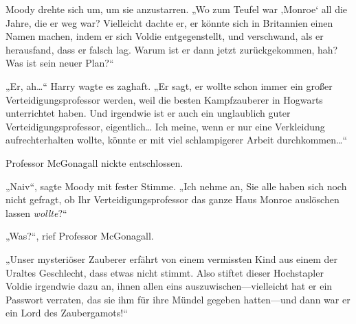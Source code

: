 Moody drehte sich um, um sie anzustarren. „Wo zum Teufel war ‚Monroe‘ all die Jahre, die er weg war? Vielleicht dachte er, er könnte sich in Britannien einen Namen machen, indem er sich Voldie entgegenstellt, und verschwand, als er herausfand, dass er falsch lag. Warum ist er dann jetzt zurückgekommen, hah? Was ist sein neuer Plan?“

„Er, ah…“ Harry wagte es zaghaft. „Er sagt, er wollte schon immer ein großer Verteidigungsprofessor werden, weil die besten Kampfzauberer in Hogwarts unterrichtet haben. Und irgendwie ist er auch ein unglaublich guter Verteidigungsprofessor, eigentlich… Ich meine, wenn er nur eine Verkleidung aufrechterhalten wollte, könnte er mit viel schlampigerer Arbeit durchkommen…“

Professor McGonagall nickte entschlossen.

„Naiv“, sagte Moody mit fester Stimme. „Ich nehme an, Sie alle haben sich noch nicht gefragt, ob Ihr Verteidigungsprofessor das ganze Haus Monroe auslöschen lassen \emph{wollte}?“

„Was?“, rief Professor McGonagall.

„Unser mysteriöser Zauberer erfährt von einem vermissten Kind aus einem der Uraltes Geschlecht, dass etwas nicht stimmt. Also stiftet dieser Hochstapler Voldie irgendwie dazu an, ihnen allen eins auszuwischen—vielleicht hat er ein Passwort verraten, das sie ihm für ihre Mündel gegeben hatten—und dann war er ein Lord des Zaubergamots!“

